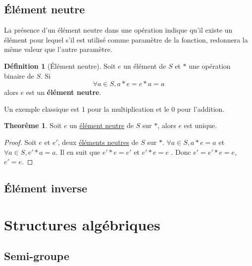 \documentclass[12pt]{book}
\def\sep{\phantom{}}
\theoremstyle{definition}
\newtheorem{definition}{Définition}[section]
\newtheorem{theorem}{Theorême}[section]
\begin{document}
\section{Élément neutre}
La présence d'un élément neutre dans une opération indique qu'il existe un élément pour lequel s'il est utilisé comme 
paramètre de la fonction, redonnera la même valeur que l'autre paramètre. 

\begin{definition}[Élément neutre]
    \label{def:neutre}
    Soit $e$ un élément de $S$ et $\ast$ une opération binaire de $S$. Si $$\forall a \in S, a \ast e = e \ast a = a$$
    alors $e$ est un \textbf{élément neutre}.
\end{definition}
Un exemple classique est 1 pour la multiplication et le 0 pour l'addition.

\begin{theorem}
    \label{thm:neutre_unique} Soit $e$ un \hyperref[def:neutre]{élément neutre} de $S$ sur $\ast$, alors $e$ est unique.
\end{theorem}

\begin{proof}
    Soit $e$ et $e'$, deux \hyperref[def:neutre]{éléments neutres} de $S$ sur $\ast$. \sep
    $\forall a \in S, a \ast e = a$ \sep et $\forall a \in S, e' \ast a = a$. \sep
    Il en suit que $e' \ast e = e'$ et $e' \ast e = e$ \sep.
    Donc $e' = e' \ast e = e$, $e' = e$.
\end{proof}
\begin{comment}
    On suppose deux éléments neutres différents afin de prouver qu'il n'existe
    qu'une seule valeur possible et qu'en fait, en bout de ligne $e = e'$. \sep 
    On utilise ici la définiton même de ce qu'est un élément neutre pour $e$. \sep 
    Maintenant, on le fait pour $e'$ \sep 
    On utilise le cas particulier de $a = e$ (puisque c'est $\forall a \in S$) et $a = e'$ \sep 
    On en conclut que $e = e'$ et est donc unique.
\end{comment}
\section{Élément inverse}

\chapter{Structures algébriques}

\section{Semi-groupe}
\end{document}
